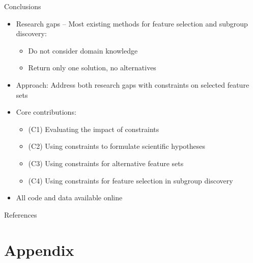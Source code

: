 \documentclass[en, navbarinline, handout]{sdqbeamer}
\begin{document}
\begin{frame}[t]{Conclusions}
	\begin{itemize}
		\item Research gaps -- Most existing methods for feature selection and subgroup discovery:
		\begin{itemize}
			\item Do not consider domain knowledge
			\item Return only one solution, no alternatives
		\end{itemize}
		\pause
		\vspace{\baselineskip}
		\item Approach: Address both research gaps with constraints on selected feature sets
		\pause
		\vspace{\baselineskip}
		\item Core contributions:
		\begin{itemize}
			\item (C1) Evaluating the impact of constraints \cite{bach2022empirical}
			\item (C2) Using constraints to formulate scientific hypotheses \cite{bach2022empirical}
			\item (C3) Using constraints for alternative feature sets \cite{bach2023finding, bach2024alternative}
			\item (C4) Using constraints for feature selection in subgroup discovery \cite{bach2025subgroup, bach2024using}
		\end{itemize}
		\item All code and data available online
	\end{itemize}
\end{frame}

\appendix
\beginbackup %

\begin{frame}[t, allowframebreaks]{References}
	\renewcommand*{\bibfont}{\small} %
	\printbibliography
\end{frame}

\section{Appendix}
\end{document}
